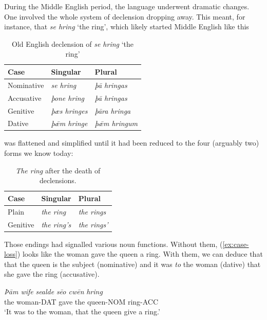 During the Middle English period, the language underwent dramatic changes. One involved the whole system of declension dropping away. This meant, for instance, that \textit{se hring} `the ring', which likely started Middle English like this

\begin{table}[h]
    \centering
    \begin{tabular}{|l|l|l|}
        \hline
        \textbf{Case} & \textbf{Singular}         & \textbf{Plural}          \\ \hline
        Nominative    & \textit{se hring}       & \textit{þā hringas}        \\ \hline
        Accusative    & \textit{þone hring}     & \textit{þā hringas}        \\ \hline
        Genitive      & \textit{þæs hringes}    & \textit{þāra hringa}      \\ \hline
        Dative        & \textit{þǣm hringe}     & \textit{þǣm hringum}      \\ \hline
    \end{tabular}
    \caption{Old English declension of \textit{se hring} `the ring'}
\end{table}

\noindent was flattened and simplified until it had been reduced to the four (arguably two) forms we know today:

\begin{table}[]
    \centering
        \begin{tabular}{lll}
        \hline
        \textbf{Case} & \textbf{Singular} & \textbf{Plural} \\
        \hline
        Plain & \textit{the ring} & \textit{the rings} \\
        Genitive   & \textit{the ring's} & \textit{the rings'} \\
        \hline
        \end{tabular}
    \caption{\textit{The ring} after the death of declensions.}
    \label{tab:gate-paradigm}
\end{table}

Those endings had signalled various noun functions. Without them, (\ref{ex:case-loss}) looks like the woman gave the queen a ring. With them, we can deduce that that the queen is the subject (nominative) and it was \textit{to} the woman (dative) that she gave the ring (accusative).

\ea \label{ex:case-loss}
    \gll \textit{Þām wife} \textit{sealde} \textit{sēo cwēn} \textit{hring}\\
        {the woman-DAT} gave {the queen-NOM} ring-ACC\\
    \glt `It was to the woman, that the queen give a ring.'
\z

